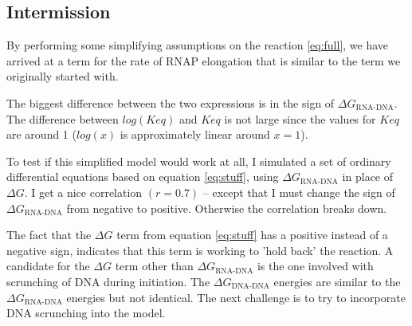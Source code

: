 \documentclass[a4paper]{article}
\begin{document}
\subsection{Intermission}
By performing some simplifying assumptions on the reaction \eqref{eq:full}, we
have arrived at a term for the rate of RNAP elongation that is similar to the
term we originally started with.

The biggest difference between the two expressions is in the sign of $\Delta
G_{\text{RNA-DNA}}$. The difference between $log(Keq)$ and $Keq$ is not large
since the values for $Keq$ are around 1 ($log(x)$ is approximately linear around $x = 1$).

To test if this simplified model would work at all, I simulated a set of
ordinary differential equations based on equation \eqref{eq:stuff}, using
$\Delta G_{\text{RNA-DNA}}$ in place of $\Delta G$. I get a nice correlation
$(r = 0.7)$ -- except that I must change the sign of $\Delta
G_{\text{RNA-DNA}}$ from negative to positive.  Otherwise the correlation
breaks down.

The fact that the $\Delta G$ term from equation \eqref{eq:stuff} has a positive
instead of a negative sign, indicates that this term is working to 'hold back'
the reaction. A candidate for the $\Delta G$ term other than $\Delta
G_{\text{RNA-DNA}}$ is the one involved with scrunching of DNA during
initiation. The $\Delta G_{\text{DNA-DNA}}$ energies are similar to the $\Delta
G_{\text{RNA-DNA}}$ energies but not identical. The next challenge is to try to
incorporate DNA scrunching into the model.
\end{document}
